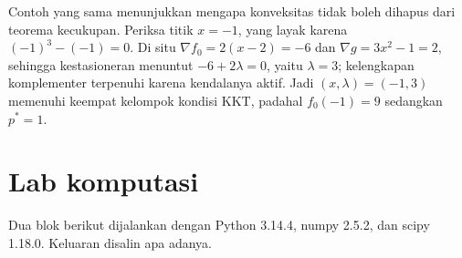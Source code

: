 Contoh yang sama menunjukkan mengapa konveksitas tidak boleh dihapus dari teorema
kecukupan. Periksa titik $x=-1$, yang layak karena $(-1)^{3}-(-1)=0$. Di situ
$\nabla f_{0}=2(x-2)=-6$ dan $\nabla g=3x^{2}-1=2$, sehingga kestasioneran menuntut
$-6+2\lambda=0$, yaitu $\lambda=3$; kelengkapan komplementer terpenuhi karena kendalanya
aktif. Jadi $(x,\lambda)=(-1,3)$ memenuhi keempat kelompok kondisi KKT, padahal
$f_{0}(-1)=9$ sedangkan $p^{*}=1$.


\section{Lab komputasi}

Dua blok berikut dijalankan dengan Python 3.14.4, numpy 2.5.2, dan scipy 1.18.0.
Keluaran disalin apa adanya.

